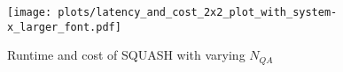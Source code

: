 \begin{figure}[]%
\centering  %
\texttt{[image: plots/latency\_and\_cost\_2x2\_plot\_with\_system-x\_larger\_font.pdf]}
\caption{Runtime and cost of SQUASH with varying $N_{QA}$}
\label{fig:squash-latency-and-cost-2x2}
\end{figure}